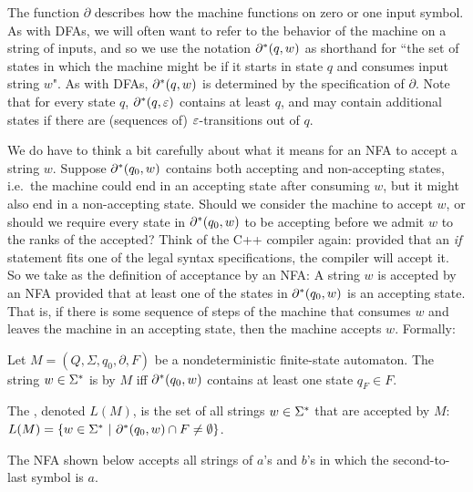The function $\partial$ describes how the machine functions on zero or one 
input symbol. 
As with DFAs, we will often want to refer to the behavior of the machine on a
string of inputs, and so we use the notation $\partial^*(q,w)$ as shorthand
for ``the set of states in which
the machine might be if it starts in state $q$ and consumes input string $w$".  
As with DFAs, $\partial^*(q,w)$ is
determined by the specification of $\partial$.  Note that for every state $q$,
$\partial^*(q, \varepsilon)$ contains at least $q$, and may contain additional states if
there are (sequences of) $\varepsilon$-transitions out of $q$. 

We do have to think a bit carefully about what it means for an NFA to accept a
string $w$.  Suppose $\partial^*(q_0,w)$ contains both accepting and non-accepting
states, i.e.\ the machine could end in an accepting state after consuming $w$,
but it might also end in a non-accepting state.  Should we consider the machine
to accept $w$, or should we require every state in $\partial^*(q_0,w)$ to be
accepting before we admit $w$ to the ranks of the accepted?  Think of the C++
compiler again: provided that an {\em if} statement fits one of the legal
syntax specifications, the compiler will accept it.  So we take as the
definition of acceptance by an NFA: A string $w$ is accepted by an NFA provided
that at least one of the states in $\partial^*(q_0, w)$ is an accepting state. 
That is, if there is some sequence of steps of the machine that consumes $w$
and leaves the machine in an accepting state, then the machine accepts $w$.
Formally:

\smallskip

\begin{definition}
Let $M= (Q, \Sigma, q_0, \partial, F)$ be a nondeterministic finite-state
automaton.  The string $w \in \Sigma^*$ is  
by $M$ iff $\partial^*(q_0,w)$ contains at least one state $q_F \in F$.

The , denoted $L(M)$, is the set of all strings 
$w \in \Sigma^*$ that are
accepted by $M$: $L(M) = \{ w \in \Sigma^* \ | \ \partial^*(q_0, w) \cap F \not= 
\emptyset\}$.
\end{definition}

\smallskip


\begin{example}\label{asome} The NFA shown below accepts all strings of $a$'s 
and $b$'s in which the second-to-last symbol is $a$.


\end{example} 

